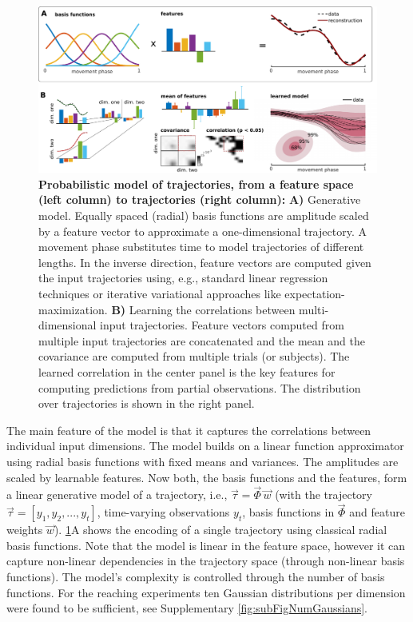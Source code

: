 \begin{figure}[t]
\centering
\includegraphics[width=1\textwidth]{Elmar/picsClean/AProbModelofMotionApproach1}
 \caption{\textbf{Probabilistic model of trajectories, from a feature space (left column) to trajectories (right column):}  
 \textbf{A)} Generative model. 
 Equally spaced (radial) basis functions are amplitude scaled by a feature vector to approximate a one-dimensional trajectory. 
 A movement phase substitutes time to model trajectories of different lengths. 
 In the inverse direction, feature vectors are computed given the input trajectories using, e.g., standard linear regression techniques or 
 iterative variational approaches like expectation-maximization. 
 \textbf{B)} Learning the correlations between multi-dimensional input trajectories. 
 Feature vectors computed from multiple input trajectories are concatenated 
 and the mean and the covariance are computed from multiple trials (or subjects). 
 The learned correlation in the center panel is the key features for computing predictions from 
 partial observations. The distribution over trajectories is shown in the right panel. 
}
\label{fig:model}
\end{figure}

The main feature of the model is that it captures the correlations between 
individual input dimensions. The model builds on a linear function approximator 
using radial basis functions with fixed means and variances. 
The amplitudes are scaled by learnable features. Now both, the basis functions and the features,  
form a linear generative model of a trajectory, i.e., $\vec \tau = \vec \Phi \, 
\vec w$ (with the trajectory $\vec \tau = [y_1, y_2, ..., y_t]$, time-varying observations $y_t$, basis functions 
in $\vec \Phi$ and feature weights $\vec w$). \FigureAbbr 
\ref{fig:model}A shows the encoding of a single trajectory using classical radial 
basis functions. Note that the model is linear in the feature space, however it 
can capture non-linear dependencies in the trajectory space (through non-linear basis functions). The model's complexity is controlled 
through the number of basis functions. For the reaching experiments 
ten Gaussian distributions per dimension were found to be sufficient, see Supplementary \FigureAbbr \ref{fig:subFigNumGaussians}.

